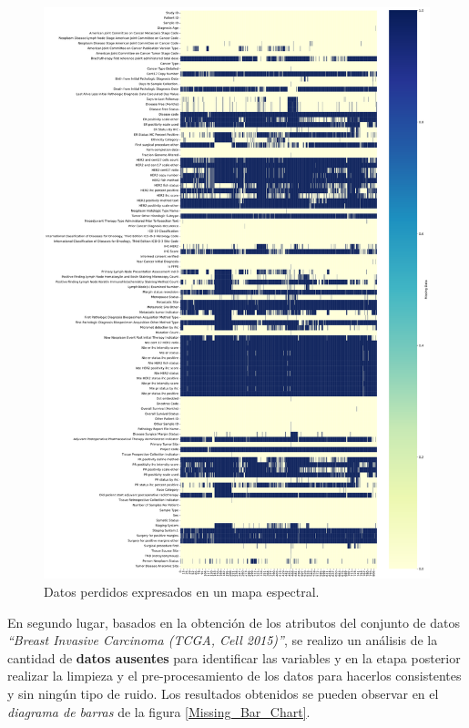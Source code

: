  \begin{figure}[!htb]
	\centering
	\includegraphics[width=1
	\linewidth]{NOTEBOOK/IMAGENES_PERDIDAS/missing_heatmap}
	\caption{Datos perdidos expresados en un mapa espectral.}
	\label{Missing_Spectrum}
\end{figure}


\clearpage
En segundo lugar, basados en la obtención de los atributos del conjunto de datos \textit{“Breast Invasive Carcinoma (TCGA, Cell 2015)”}, se realizo un análisis de la cantidad de \textbf{datos ausentes} para identificar las variables y en la etapa posterior realizar la limpieza y el pre-procesamiento de los datos para hacerlos consistentes y sin ningún tipo de ruido. Los resultados obtenidos se pueden observar en el \textit{diagrama de barras} de la figura \ref{Missing_Bar_Chart}. 

